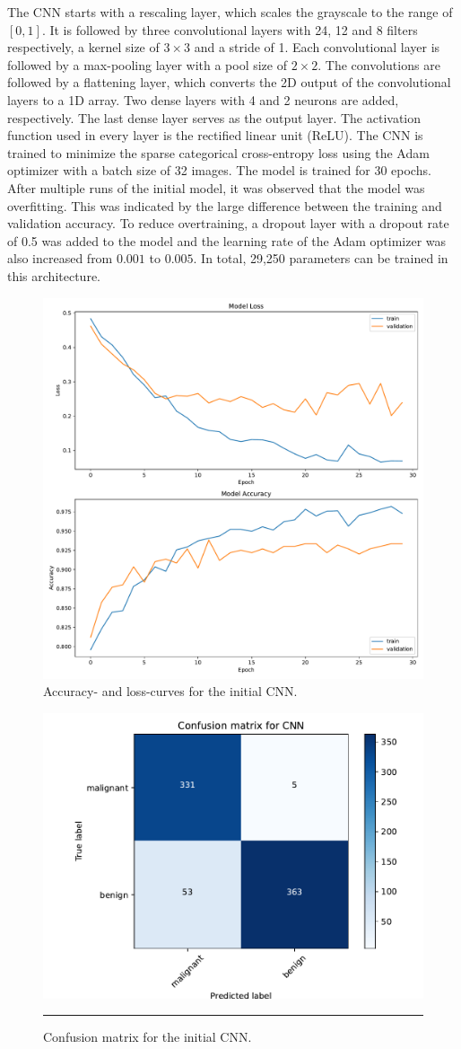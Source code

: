 The CNN starts with a rescaling layer, which scales the grayscale to the range of $[0, 1]$.
It is followed by three convolutional layers with 24, 12 and 8 filters respectively, a kernel size of $3 \times 3$ and a stride of 1.
Each convolutional layer is followed by a max-pooling layer with a pool size of $2 \times 2$.
The convolutions are followed by a flattening layer, which converts the 2D output of the convolutional layers to a 1D array.
Two dense layers with 4 and 2 neurons are added, respectively.
The last dense layer serves as the output layer.
The activation function used in every layer is the rectified linear unit (ReLU).
The CNN is trained to minimize the sparse categorical cross-entropy loss using the Adam optimizer \cite{adam} with a batch size of 32 images.
The model is trained for 30 epochs.
After multiple runs of the initial model, it was observed that the model was overfitting.
This was indicated by the large difference between the training and validation accuracy.
To reduce overtraining, a dropout layer with a dropout rate of 0.5 was added to the model and the learning rate of the Adam optimizer was also increased from $0.001$ to $0.005$.
In total, 29,250 parameters can be trained in this architecture.
\begin{figure}[H]
    \centering
    \includegraphics[width=.65\textwidth]{plots/Initial-history.pdf}
    \caption{Accuracy- and loss-curves for the initial CNN.}
    \label{fig:learningCurveInitial}
\end{figure}
\begin{figure}
    \centering
    \includegraphics[width=.48\textwidth]{plots/confusion_matrix_CNN.pdf}
    \caption{Confusion matrix for the initial CNN.}
    \label{fig:confusionMatrixInitial}
    \rule{4cm}{0cm}
\end{figure}
